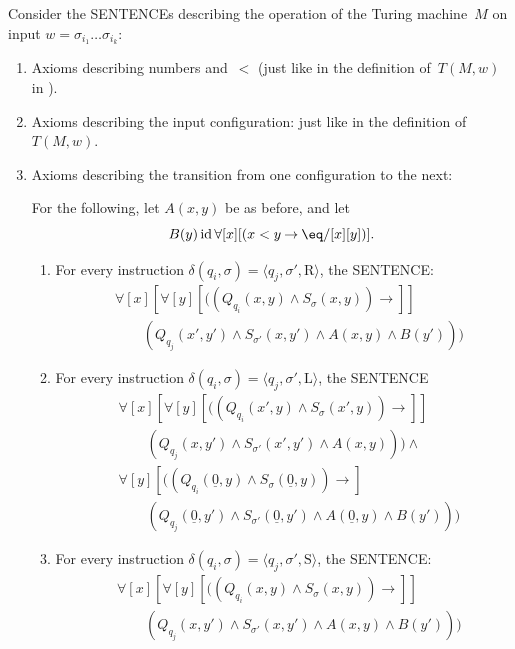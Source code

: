 \documentclass[10pt,a4paper]{article}
\makeatletter
\newcommand*{\olup}[1]{\MakeUppercase{#1}}
\theoremstyle{plain}
\theoremstyle{definition}
\theoremstyle{remark}
\newcommand*{\ollabel}[1]{\label{#1}}
\newcommand{\olref}{\@ifnextchar[{\olref@i}{\olref@final}}
\def\olref@i[#1]{\@ifnextchar[{\olref@ii}{\olref@final}}
\def\olref@ii[#1]{\@ifnextchar[{\olref@iii}{\olref@final}}
\def\olref@iii[#1]{\olref@final}
\def\olref@final#1{\ref{#1}}
\providecommand{\lif}{\mathbin{\rightarrow}}
\providecommand{\lforall}{\mathord{\forall}}
\providecommand{\Obj}{}
\providecommand{\tuple}[1]{\langle #1 \rangle}
\providecommand{\num}[1]{\underline{#1}}
\providecommand{\TMstay}{\mathrm{S}}
\providecommand{\TMright}{\mathrm{R}}
\providecommand{\TMleft}{\mathrm{L}}
\providecommand{\ident}{\operatorname{id}}
\makeatother
\begin{document}
Consider the \olup{sentence}s describing the operation of the Turing
machine~$M$ on input $w = \sigma_{i_1}\dots\sigma_{i_k}$:
\begin{enumerate}
\item Axioms describing numbers and~$<$ (just like in the definition
of~$T(M,w)$ in \olref[rep]{sec}).
\item Axioms describing the input configuration: just like in the definition
of~$T(M,w)$.
\item Axioms describing the transition from one configuration to
  the next:

For the following, let $A(x, y)$ be as before, and let
\[
  B(y) \ident \lforall[x][(x < y \lif \eq/[x][y])].
\]
\begin{enumerate}
\item \ollabel{rep-right} For every instruction $\delta(q_i, \sigma) =
  \tuple{q_j, \sigma', \TMright}$, the \olup{sentence}:
\begin{align*}
& \lforall[x][\lforall[y][(
   (\Obj Q_{q_i}(x, y) \land \Obj S_{\sigma}(x, y)) \lif {}]] \\
&\qquad   (\Obj Q_{q_j}(x', y') \land \Obj S_{\sigma'}(x, y') \land
A(x, y) \land B(y')))
\end{align*}
\item \ollabel{rep-left} For every instruction $\delta(q_i, \sigma) =
  \tuple{q_j, \sigma', \TMleft}$, the \olup{sentence}
\begin{align*}
& \lforall[x][\lforall[y][
    ((\Obj Q_{q_i}(x', y) \land \Obj S_{\sigma}(x', y)) \lif {}]]\\
& \qquad   (\Obj Q_{q_j}(x, y') \land \Obj S_{\sigma'}(x', y') \land
A(x, y))) \land {}\\
& \lforall[y][((\Obj Q_{q_i}(\num{0}, y) \land \Obj S_{\sigma}(\num{0},
    y)) \lif {}]\\
& \qquad (\Obj Q_{q_j}(\num{0}, y') \land \Obj S_{\sigma'}(\num{0},
  y') \land A(\num{0}, y) \land B(y')))
\end{align*}
\item \ollabel{rep-stay} For every instruction $\delta(q_i, \sigma) =
  \tuple{q_j, \sigma', \TMstay}$, the \olup{sentence}:
\begin{align*}
& \lforall[x][\lforall[y][(
   (\Obj Q_{q_i}(x, y) \land \Obj S_{\sigma}(x, y)) \lif {}]] \\
&\qquad (\Obj Q_{q_j}(x, y') \land \Obj S_{\sigma'}(x, y') \land
A(x, y) \land B(y')))
\end{align*}
\end{enumerate}

\end{enumerate}
\end{document}
